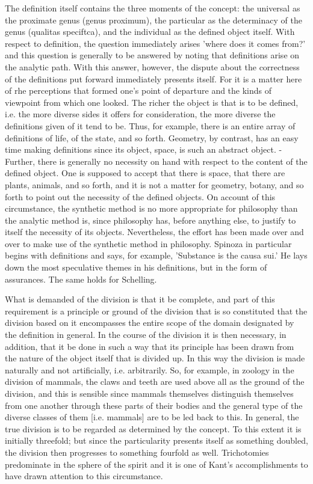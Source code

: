 The definition itself contains the three moments of the concept:
the universal as the proximate genus (genus proximum),
the particular as the determinacy of the genus (qualitas speciftca),
and the individual as the defined object itself.
With respect to definition, the question immediately
arises 'where does it comes from?' and this question is generally to be answered
by noting that definitions arise on the analytic path.
With this answer, however, the dispute about the correctness of the definitions put forward immediately
presents itself. For it is a matter here of rhe perceptions that formed one's point
of departure and the kinds of viewpoint from which one looked. The richer the
object is that is to be defined, i.e. the more diverse sides it offers for
consideration, the more diverse the definitions given of it tend to be. Thus, for
example, there is an entire array of definitions of life, of the state, and so forth.
Geometry, by contrast, has an easy time making definitions since its object, space,
is such an abstract object. - Further, there is generally no necessity
on hand with respect to the content of the defined object.
One is supposed to accept that there is space, that there are plants, animals, and so
forth, and it is not a matter for geometry, botany, and so forth to point out the
necessity of the defined objects. On account of this circumstance, the
synthetic method is no more appropriate for philosophy than the analytic method
is, since philosophy has, before anything else, to justify to itself the necessity of
its objects. Nevertheless, the effort has been made over and over
to make use of the synthetic method in philosophy. Spinoza in particular begins
with definitions and says, for example, 'Substance is the causa sui.' He lays down
the most speculative themes in his definitions, but in the form of assurances.
The same holds for Schelling.

What is demanded of the division is that it be complete, and part of
this requirement is a principle or ground of the division that is so constituted that
the division based on it encompasses the entire scope of the domain designated
by the definition in general.
In the course of the division it is then necessary, in addition,
that it be done in such a way that its principle has been drawn from
the nature of the object itself that is divided up.
In this way the division is made naturally and not artificially, i.e. arbitrarily.
So, for example, in zoology in the division of mammals, the claws and teeth are used above all as the
ground of the division, and this is sensible since mammals themselves distinguish
themselves from one another through these parts of their bodies and the general
type of the diverse classes of them [i.e. mammals] are to be led back to this.
In general, the true division is to be regarded as determined by the concept.
To this extent it is initially threefold; but since the particularity presents itself
as something doubled, the division then progresses to something fourfold as well.
Trichotomies predominate in the sphere of the spirit and it is one of Kant's accomplishments
to have drawn attention to this circumstance.

